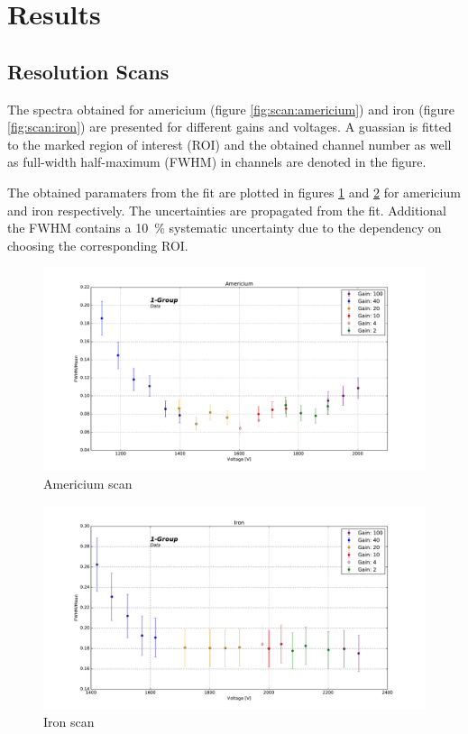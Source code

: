 \section{Results}
\subsection{Resolution Scans}
The spectra obtained for americium (figure \ref{fig:scan:americium}) and iron
(figure \ref{fig:scan:iron}) are presented for different gains and voltages. A
guassian is fitted to the marked region of interest (ROI) and the obtained channel number as well as
full-width half-maximum (FWHM) in channels are denoted in the figure.

The obtained paramaters from the fit are plotted in figures
\ref{fig:resolution:americium} and \ref{fig:resolution:iron} for americium and
iron respectively. The uncertainties are propagated from the fit. Additional the
FWHM contains a \SI{10}{\percent} systematic uncertainty due to the dependency
on choosing the corresponding ROI.

\begin{figure}[htb]
  \includegraphics[width=\linewidth]{graphics/americium_scan}
  \caption{Americium scan}
  \label{fig:resolution:americium}
\end{figure}

\begin{figure}[htb]
  \includegraphics[width=\linewidth]{graphics/iron_scan}
  \caption{Iron scan}
  \label{fig:resolution:iron}
\end{figure}


